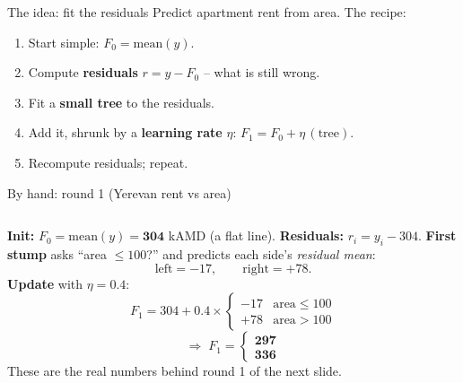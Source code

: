\documentclass[aspectratio=169]{beamer}
\begin{document}
\begin{frame}{The idea: fit the residuals}
  Predict apartment rent from area. The recipe:
  \begin{enumerate}\small
    \item Start simple: $F_0 = \text{mean}(y)$.
    \item Compute \textbf{residuals} $r = y - F_0$ -- what is still wrong.
    \item Fit a \textbf{small tree} to the residuals.
    \item Add it, shrunk by a \textbf{learning rate} $\eta$: $F_1 = F_0 + \eta\,(\text{tree})$.
    \item Recompute residuals; repeat.
  \end{enumerate}
  \vfill
\end{frame}

\begin{frame}{By hand: round 1 (Yerevan rent vs area)}
  \begin{columns}[T]
    \small
    \textbf{Init:} $F_0 = \text{mean}(y) = \mathbf{304}$ kAMD (a flat line).
    \vskip 3pt
    \textbf{Residuals:} $r_i = y_i - 304$.
    \vskip 3pt
    \textbf{First stump} asks ``area $\le 100$?'' and predicts each side's
    \emph{residual mean}:
    \[
      \text{left} = -17,\qquad \text{right} = +78 .
    \]
    \textbf{Update} with $\eta = 0.4$:
    \[
      F_1 = 304 + 0.4 \times
      \begin{cases} -17 & \text{area} \le 100 \\ +78 & \text{area} > 100 \end{cases}
    \]
    \[
      \Rightarrow\; F_1 = \begin{cases} \mathbf{297} \\ \mathbf{336} \end{cases}
    \]
    \vskip 12pt
    \vskip 6pt
    \footnotesize These are the real numbers behind round 1 of the next slide.
  \end{columns}
\end{frame}
\end{document}
